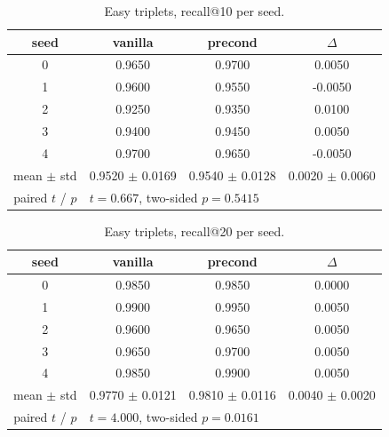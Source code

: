 \begin{table}[H]
\centering
\caption{Easy triplets, recall@10 per seed.}
\label{tab:recall-easy-K10}
\begin{tabular}{c c c c}
\toprule
seed & vanilla & precond & $\Delta$ \\
\midrule
0 & 0.9650 & 0.9700 & 0.0050 \\
1 & 0.9600 & 0.9550 & -0.0050 \\
2 & 0.9250 & 0.9350 & 0.0100 \\
3 & 0.9400 & 0.9450 & 0.0050 \\
4 & 0.9700 & 0.9650 & -0.0050 \\
\midrule
mean $\pm$ std & 0.9520 $\pm$ 0.0169 & 0.9540 $\pm$ 0.0128 & 0.0020 $\pm$ 0.0060 \\
paired $t$ / $p$ & \multicolumn{3}{l}{$t = 0.667$, two-sided $p = 0.5415$} \\
\bottomrule
\end{tabular}
\end{table}

\begin{table}[H]
\centering
\caption{Easy triplets, recall@20 per seed.}
\label{tab:recall-easy-K20}
\begin{tabular}{c c c c}
\toprule
seed & vanilla & precond & $\Delta$ \\
\midrule
0 & 0.9850 & 0.9850 & 0.0000 \\
1 & 0.9900 & 0.9950 & 0.0050 \\
2 & 0.9600 & 0.9650 & 0.0050 \\
3 & 0.9650 & 0.9700 & 0.0050 \\
4 & 0.9850 & 0.9900 & 0.0050 \\
\midrule
mean $\pm$ std & 0.9770 $\pm$ 0.0121 & 0.9810 $\pm$ 0.0116 & 0.0040 $\pm$ 0.0020 \\
paired $t$ / $p$ & \multicolumn{3}{l}{$t = 4.000$, two-sided $p = 0.0161$} \\
\bottomrule
\end{tabular}
\end{table}

